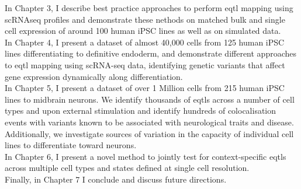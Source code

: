 In Chapter 3, I describe best practice approaches to perform \gls{eqtl} mapping using scRNAseq profiles and demonstrate these nethods on matched bulk and single cell expression of around 100 human iPSC lines as well as on simulated data.  \\

In Chapter 4, I present a dataset of almost 40,000 cells from 125 human iPSC lines differentiating to definitive endoderm, and demonstrate different approaches to \gls{eqtl} mapping using scRNA-seq data, identifying genetic variants that affect gene expression dynamically along differentiation. \\

In Chapter 5, I present a dataset of over 1 Million cells from 215 human iPSC lines to midbrain neurons.
We identify thousands of \glspl{eqtl} across a number of cell types and upon external stimulation and identify hundreds of colocalisation events with variants known to be associated with neurological traits and disease.
Additionally, we investigate sources of variation in the capacity of individual cell lines to differentiate toward neurons.\\

In Chapter 6, I present a novel method to jointly test for context-specific \glspl{eqtl} across multiple cell types and states defined at single cell resolution. \\

Finally, in Chapter 7 I conclude and discuss future directions.